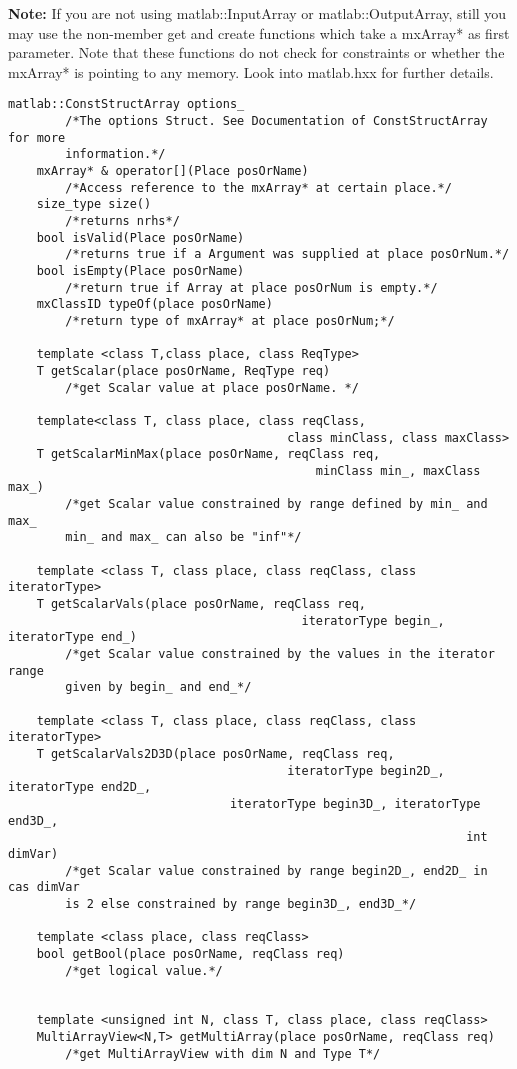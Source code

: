 \documentclass[a4paper,10pt]{article}
\begin{document}
\textbf{Note:} If you are not using matlab::InputArray or matlab::OutputArray, still you may use
the non-member get and create functions  which take a mxArray* as first parameter. 
Note that these functions do not check for constraints or whether the mxArray* is pointing to any
memory. Look into matlab.hxx for further details.

\begin{lstlisting}[caption={matlab::InputArray}]
	matlab::ConstStructArray options_ 
		/*The options Struct. See Documentation of ConstStructArray for more 
		information.*/
	mxArray* & operator[](Place posOrName)
		/*Access reference to the mxArray* at certain place.*/
	size_type size()
		/*returns nrhs*/
	bool isValid(Place posOrName)
		/*returns true if a Argument was supplied at place posOrNum.*/
	bool isEmpty(Place posOrName)
		/*return true if Array at place posOrNum is empty.*/
	mxClassID typeOf(place posOrName)
		/*return type of mxArray* at place posOrNum;*/

	template <class T,class place, class ReqType>
	T getScalar(place posOrName, ReqType req)
		/*get Scalar value at place posOrName. */
    
	template<class T, class place, class reqClass, 
                                       class minClass, class maxClass>
	T getScalarMinMax(place posOrName, reqClass req, 
                                           minClass min_, maxClass max_)
		/*get Scalar value constrained by range defined by min_ and max_
		min_ and max_ can also be "inf"*/
	
	template <class T, class place, class reqClass, class iteratorType>
	T getScalarVals(place posOrName, reqClass req, 
                                         iteratorType begin_, iteratorType end_)
		/*get Scalar value constrained by the values in the iterator range 
		given by begin_ and end_*/

	template <class T, class place, class reqClass, class iteratorType>
	T getScalarVals2D3D(place posOrName, reqClass req, 
                                       iteratorType begin2D_, iteratorType end2D_,
		                       iteratorType begin3D_, iteratorType end3D_,
		                                                        int dimVar)
		/*get Scalar value constrained by range begin2D_, end2D_ in cas dimVar 
		is 2 else constrained by range begin3D_, end3D_*/

	template <class place, class reqClass>
	bool getBool(place posOrName, reqClass req)
		/*get logical value.*/


	template <unsigned int N, class T, class place, class reqClass>
	MultiArrayView<N,T> getMultiArray(place posOrName, reqClass req)
		/*get MultiArrayView with dim N and Type T*/
	

\end{lstlisting}
\end{document}
